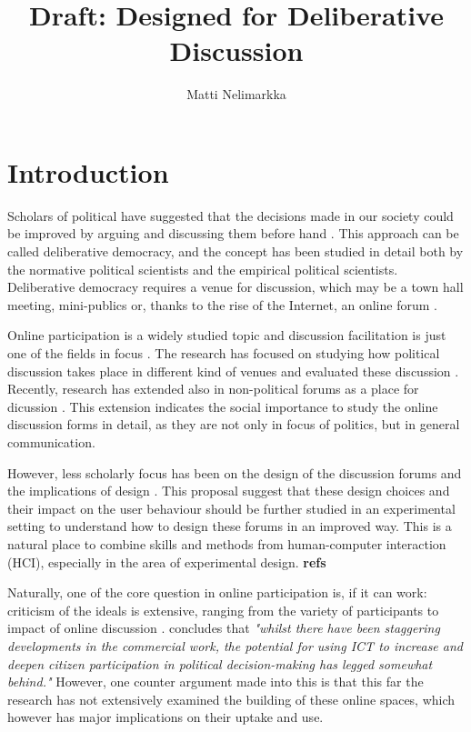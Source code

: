 \documentclass[journal,a4paper]{IEEEtran}
\author{Matti Nelimarkka}
\title{Draft: Designed for Deliberative Discussion}
\begin{document}
\maketitle

\setlength{\parindent}{0pt}
\setlength{\parskip}{1ex}

\section{Introduction}
Scholars of political have suggested that the decisions made in our society could be improved by arguing and discussing them before hand \cite{xxx}. This approach can be called deliberative democracy, and the concept has been studied in detail both by the normative political scientists and the empirical political scientists. Deliberative democracy requires a venue for discussion, which may be a town hall meeting, mini-publics or, thanks to the rise of the Internet, an online forum .

Online participation is a widely studied topic and discussion facilitation is just one of the fields in focus . The research has focused on studying how political discussion takes place in different kind of venues  and evaluated these discussion . Recently, research has extended also in non-political forums as a place for dicussion \cite{graham12}. This extension indicates the social importance to study the online discussion forms in detail, as they are not only in focus of politics, but in general communication.

However, less scholarly focus has been on the design of the discussion forums and the implications of design . This proposal suggest that these design choices and their impact on the user behaviour should be further studied in an experimental setting to understand how to design these forums in an improved way. This is a natural place to combine skills and methods from human-computer interaction (HCI), especially in the area of experimental design. \textbf{refs}

Naturally, one of the core question in online participation is, if it can work: criticism of the ideals is extensive, ranging from the variety of participants to impact of online discussion .  concludes that \textit{"whilst there have been staggering developments in the commercial work, the potential for using ICT to increase and deepen citizen participation in political decision-making has legged somewhat behind."} However, one counter argument made into this is that this far the research has not extensively examined the building of these online spaces, which however has major implications on their uptake and use.
\end{document}
